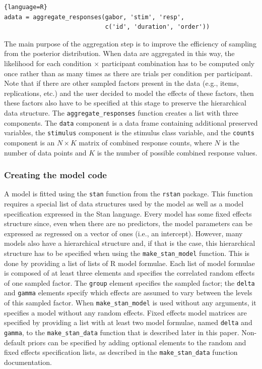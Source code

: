 \documentclass[a4paper,man,apacite,floatsintext]{apa6}
\newcommand{\code}[1]{\texttt{#1}}
\begin{document}
\begin{lstlisting}{language=R}
adata = aggregate_responses(gabor, 'stim', 'resp', 
                            c('id', 'duration', 'order'))  
\end{lstlisting}

The main purpose of the aggregation step is to improve the efficiency
of sampling from the posterior distribution. When data are aggregated
in this way, the likelihood for each condition $\times$ participant
combination has to be computed only once rather than as many times as
there are trials per condition per participant. Note that if there are
other sampled factors present in the data (e.g., items, replications,
etc.) and the user decided to model the effects of these factors, then
these factors also have to be specified at this stage to preserve the
hierarchical data structure. The \code{aggregate\_responses} function
creates a list with three components. The \code{data} component is a
data frame containing additional preserved variables, the
\code{stimulus} component is the stimulus class variable, and the
\code{counts} component is an $N\times K$ matrix of combined response
counts, where $N$ is the number of data points and $K$ is the number
of possible combined response values.

\subsubsection{Creating the model code}

A model is fitted using the \code{stan} function from the \code{rstan}
package. This function requires a special list of data structures used
by the model as well as a model specification expressed in the Stan
language. Every model has some fixed effects structure since, even
when there are no predictors, the model parameters can be expressed as
regressed on a vector of ones (i.e., an intercept). However, many
models also have a hierarchical structure and, if that is the case,
this hierarchical structure has to be specified when using the
\code{make\_stan\_model} function. This is done by providing a list of
lists of R model formulae. Each list of model formulae is composed of
at least three elements and specifies the correlated random effects of
one sampled factor. The \code{group} element specifies the sampled
factor; the \code{delta} and \code{gamma} elements specify which
effects are assumed to vary between the levels of this sampled
factor. When \code{make\_stan\_model} is used without any arguments, it
specifies a model without any random effects. Fixed effects model
matrices are specified by providing a list with at least two model
formulae, named \code{delta} and \code{gamma}, to the
\code{make\_stan\_data} function that is described later in this
paper. Non-default priors can be specified by adding optional elements
to the random and fixed effects specification lists, as described in
the \code{make\_stan\_data} function documentation.
\end{document}
